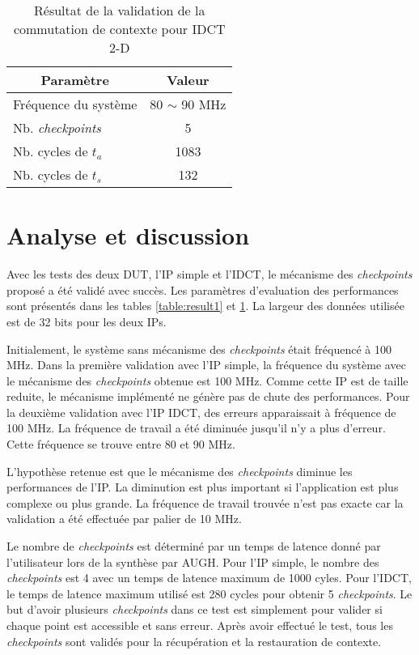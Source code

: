 \begin{table}[h]
	\caption{Résultat de la validation de la commutation de contexte pour IDCT 2-D}
 	\label{table:result2}
	\vspace{-2mm}
	\begin{center}
		\begin{tabular}{|l|c|}
			\hline
			\multicolumn{1}{|c|}{\cellcolor{black!30} \textbf{Paramètre}}   				& 	\multicolumn{1}{c|}{\cellcolor{black!30} \textbf{Valeur}} 	\\
			\hline
			Fréquence du système	&	80 $\sim$ 90 MHz	\\
			Nb. \emph{checkpoints}	&	5 			\\
			Nb. cycles de $t_a$		&	1083		\\
			Nb. cycles de $t_s$		&	132			\\
			\hline
		\end{tabular}
	\end{center}
	\vspace{-5mm}
\end{table}

\section{Analyse et discussion}

Avec les tests des deux DUT, l'IP simple et l'IDCT, le mécanisme des \emph{checkpoints} proposé a été validé avec succès.
Les paramètres d'evaluation des performances sont présentés dans les tables \ref{table:result1} et \ref{table:result2}.
La largeur des données utilisée est de 32 bits pour les deux IPs.

Initialement, le système sans mécanisme des \emph{checkpoints} était fréquencé à 100 MHz.
Dans la première validation avec l'IP simple, la fréquence du système avec le mécanisme des
\emph{checkpoints} obtenue est 100 MHz. Comme cette IP est de taille reduite, le mécanisme
implémenté ne génère pas de chute des performances.
Pour la deuxième validation avec l'IP IDCT, des erreurs apparaissait à fréquence de 100 MHz.
La fréquence de travail a été diminuée jusqu'il n'y a plus d'erreur. Cette fréquence se trouve entre 80 et 90 MHz.

L'hypothèse retenue est que le mécanisme des \emph{checkpoints} diminue les performances de l'IP. La diminution est plus important
si l'application est plus complexe ou plus grande. La fréquence de travail trouvée n'est pas exacte 
car la validation a été effectuée par palier de 10 MHz.

Le nombre de \emph{checkpoints} est déterminé par un temps de latence donné par l'utilisateur lors de la synthèse par AUGH. Pour l'IP simple,
le nombre des \emph{checkpoints} est 4 avec un temps de latence maximum de 1000 cyles. 
Pour l'IDCT, le temps de latence maximum utilisé est 280 cycles pour obtenir 5 \emph{checkpoints}.
Le but d'avoir plusieurs \emph{checkpoints} dans ce test est simplement pour valider si chaque point est accessible et sans erreur.
Après avoir effectué le test, tous les \emph{checkpoints} sont validés pour la récupération et la restauration de contexte.

